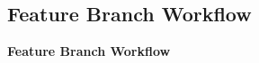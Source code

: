 \subsection{Feature Branch Workflow}\label{subsec:feature-branch-workflow}
\begin{frame}[c]
    \centering
    \Large
    \textbf{Feature Branch Workflow}
\end{frame}
